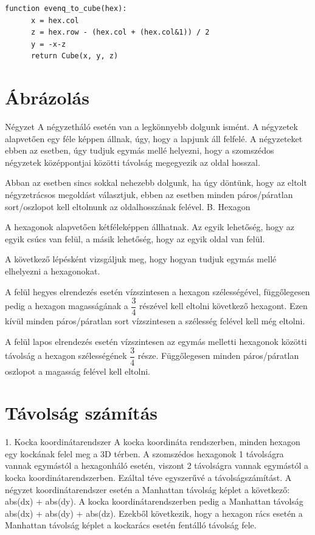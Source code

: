 \begin{verbatim}
function evenq_to_cube(hex):
      x = hex.col
      z = hex.row - (hex.col + (hex.col&1)) / 2
      y = -x-z
      return Cube(x, y, z)
\end{verbatim}


\section{Ábrázolás}

Négyzet
A négyzetháló esetén van a legkönnyebb dolgunk ismént. A négyzetek alapvetően egy féle képpen állnak, úgy, hogy a lapjunk áll felfelé.  A négyzeteket ebben az esetben, úgy tudjuk egymás mellé helyezni, hogy a szomszédos négyzetek középpontjai közötti távolság megegyezik az oldal hosszal. 

Abban az esetben sincs sokkal nehezebb dolgunk, ha úgy döntünk, hogy az eltolt négyzetrácsos megoldást választjuk, ebben az esetben minden páros/páratlan sort/oszlopot kell eltolnunk az oldalhosszának felével.
B. Hexagon

A hexagonok alapvetően kétféleképpen állhatnak. Az egyik lehetőség, hogy az egyik csúcs van felül, a másik lehetőség, hogy az egyik oldal van felül. 

A következő lépésként vizsgáljuk meg, hogy hogyan tudjuk egymás mellé elhelyezni a hexagonokat.

A felül hegyes elrendezés esetén vízszintesen a hexagon szélességével, függőlegesen pedig a hexagon magasságának a $\dfrac{3}{4}$ részével kell eltolni következő hexagont. Ezen kívül minden páros/páratlan sort vízszintesen a szélesség felével kell még eltolni.

A felül lapos elrendezés esetén vízszintesen az egymás melletti hexagonok közötti távolság a hexagon szélességének $\dfrac{3}{4}$ része. Függőlegesen minden páros/páratlan oszlopot a magasság felével kell eltolni.

\section{Távolság számítás}

1. Kocka koordinátarendszer
A kocka koordináta rendszerben, minden hexagon egy kockának felel meg a 3D térben. A szomszédos hexagonok 1 távolságra vannak egymástól a hexagonháló esetén, viszont 2 távolságra vannak egymástól a kocka koordinátarendszerben. Ezáltal téve egyszerűvé a távolságszámítást. A négyzet koordinátarendszer esetén a Manhattan távolság képlet a következő: abs(dx) + abs(dy). A kocka koordinátarendszerben pedig a Manhattan távolság abs(dx) + abs(dy) + abs(dz). Ezekből következik, hogy a hexagon rács esetén a Manhattan távolság képlet a kockarács esetén fentálló távolság fele.

